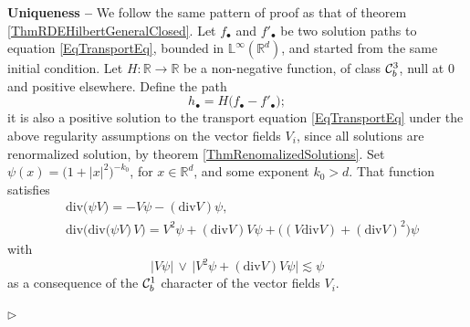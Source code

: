 \documentclass[11pt,a4paper]{amsart}
\newcommand{\RR}{\mathbb{R}}  \newcommand{\CC}{\mathbb{C}}  \newcommand{\LL}{\mathbb{L}}  \newcommand{\WW}{\mathbb{W}}
\newcommand{\ssk}{\smallskip}
\numberwithin{equation}{section} %
\newenvironment{Dem}{%
    \begin{list}{\hspace{0.5cm}{\sc Proof --}}{%
        \setlength{\topsep}{0pt}%
        \setlength{\leftmargin}{0pt}%
        \setlength{\rightmargin}{0pt}%
        \setlength{\listparindent}{0pt}%
        \setlength{\itemindent}{0pt}%
        \setlength{\parsep}{0pt}%
        \addtolength{\leftmargin}{20pt}%
        \addtolength{\rightmargin}{0pt}%
    } \item }{\hfill{\space $\rhd$}\end{list}\smallskip}
\begin{document}
\begin{Dem}
{\bf Uniqueness --} We follow the same pattern of proof as that of theorem \ref{ThmRDEHilbertGeneralClosed}. Let $f_\bullet$ and $f'_\bullet$ be two solution paths to equation \eqref{EqTransportEq}, bounded in $\LL^\infty(\RR^d)$, and started from the same initial condition. Let $H : \RR\rightarrow\RR$ be a non-negative function, of class $\mathcal{C}^3_b$, null at $0$ and positive elsewhere. Define the path 
$$
h_\bullet = H\big(f_\bullet - f'_\bullet\big);
$$
it is also a positive solution to the transport equation \eqref{EqTransportEq} under the above regularity assumptions on the vector fields $V_i$, since all solutions are renormalized solution, by theorem \ref{ThmRenomalizedSolutions}. Set $\psi(x) = \big(1+|x|^2\big)^{-k_0}$, for $x\in\RR^d$, and some exponent $k_0>d$. That function satisfies 
\begin{equation*}
\begin{split}
&\textrm{div}\big(\psi V\big) = -V\psi - (\textrm{div}V)\psi, \\
&\textrm{div}\Big(\textrm{div}\big(\psi V\big)\,V\Big) = V^2\psi + (\textrm{div}V)V\psi + \big((V\textrm{div}V)+(\textrm{div}V)^2\big)\psi  
\end{split}
\end{equation*}
with 
\begin{equation*}
\Big|V\psi\Big| \,\vee\, \Big|V^2\psi + (\textrm{div}V)V\psi\Big| \lesssim \psi
\end{equation*}
as a consequence of the $\mathcal{C}^1_b$ character of the vector fields $V_i$. 

\ssk


\end{Dem}
\end{document}
